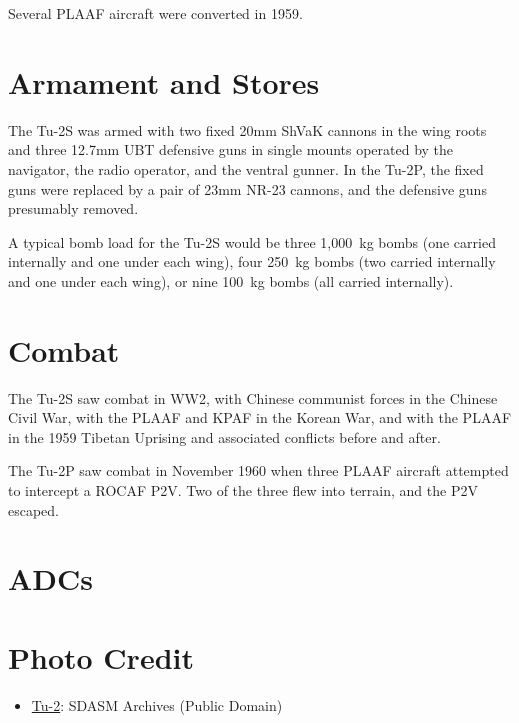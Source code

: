 Several PLAAF aircraft were converted in 1959.

\section{Armament and Stores}

The Tu-2S was armed with two fixed 20mm ShVaK cannons in the wing roots and three 12.7mm UBT defensive guns in single mounts operated by the navigator, the radio operator, and the ventral gunner. In the Tu-2P, the fixed guns were replaced by a pair of 23mm NR-23 cannons, and the defensive guns presumably removed.

A typical bomb load for the Tu-2S would be three 1,000~kg bombs (one carried internally and one under each wing), four 250~kg bombs (two carried internally and one under each wing), or nine 100~kg bombs (all carried internally).

\section{Combat}

The Tu-2S saw combat in WW2, with Chinese communist forces in the Chinese Civil War, with the PLAAF and KPAF in the Korean War, and with the PLAAF in the 1959 Tibetan Uprising and associated conflicts before and after.

The Tu-2P saw combat in November 1960 when three PLAAF aircraft attempted to intercept a ROCAF P2V. Two of the three flew into terrain, and the P2V escaped.

\section{ADCs}
\begin{adclist}
\end{adclist}

\section{Photo Credit}
\begin{itemize}\raggedright
    \item \href{https://commons.wikimedia.org/wiki/File:Tu-2_45937881.jpg}{Tu-2}: SDASM Archives (Public Domain)
\end{itemize}
